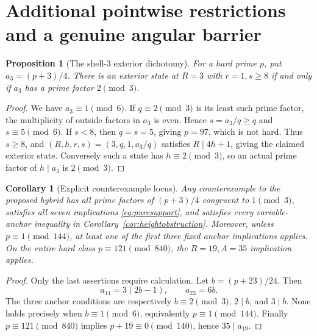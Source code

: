 \documentclass[11pt]{article}
\newtheorem{proposition}[theorem]{Proposition}
\newtheorem{corollary}[theorem]{Corollary}
\theoremstyle{definition}\newtheorem{definition}[theorem]{Definition}
\theoremstyle{remark}\newtheorem{remark}[theorem]{Remark}
\begin{document}
\section{Additional pointwise restrictions and a genuine angular barrier}
\begin{proposition}[The shell-$3$ exterior dichotomy]\label{prop:R3}
For a hard prime $p$, put $a_3=(p+3)/4$. There is an exterior state at $R=3$ with $r=1,s\ge8$ if and only if $a_3$ has a prime factor $2\pmod3$.
\end{proposition}
\begin{proof}
We have $a_3\equiv1\pmod6$. If $q\equiv2\pmod3$ is its least such prime factor, the multiplicity of outside factors in $a_3$ is even. Hence $s=a_3/q\ge q$ and $s\equiv5\pmod6$. If $s<8$, then $q=s=5$, giving $p=97$, which is not hard. Thus $s\ge8$, and $(R,h,r,s)=(3,q,1,a_3/q)$ satisfies $R\mid4h+1$, giving the claimed exterior state. Conversely such a state has $h\equiv2\pmod3$, so an actual prime factor of $h\mid a_3$ is $2\pmod3$.
\end{proof}

\begin{corollary}[Explicit counterexample locus]\label{cor:locus}
Any counterexample to the proposed hybrid has all prime factors of $(p+3)/4$ congruent to $1\pmod3$, satisfies all seven implications \eqref{eq:puresupport}, and satisfies every variable-anchor inequality in Corollary~\ref{cor:heightobstruction}.
Moreover, unless $p\equiv1\pmod{144}$, at least one of the first three fixed anchor implications applies. On the entire hard class $p\equiv121\pmod{840}$, the $R=19,A=35$ implication applies.
\end{corollary}
\begin{proof}
Only the last assertions require calculation. Let $b=(p+23)/24$. Then
\[
 a_{11}=3(2b-1),\qquad a_{23}=6b.
\]
The three anchor conditions are respectively $b\equiv2\pmod3$, $2\mid b$, and $3\mid b$. None holds precisely when $b\equiv1\pmod6$, equivalently $p\equiv1\pmod{144}$. Finally $p\equiv121\pmod{840}$ implies $p+19\equiv0\pmod{140}$, hence $35\mid a_{19}$.
\end{proof}
\end{document}
